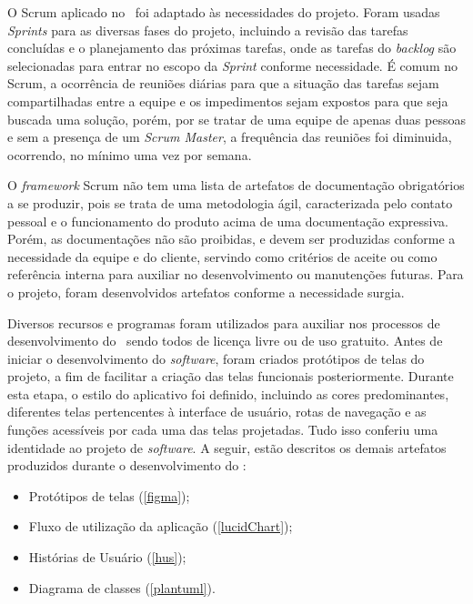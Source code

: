 O Scrum aplicado no \appName\ foi adaptado às necessidades do projeto. Foram usadas \textit{Sprints} para as diversas fases do projeto, incluindo a revisão das tarefas concluídas e o planejamento das próximas tarefas, onde as tarefas do \textit{backlog} são selecionadas para entrar no escopo da \textit{Sprint} conforme necessidade. É comum no Scrum, a ocorrência de reuniões diárias para que a situação das tarefas sejam compartilhadas entre a equipe e os impedimentos sejam expostos para que seja buscada uma solução, porém, por se tratar de uma equipe de apenas duas pessoas e sem a presença de um \textit{Scrum Master}, a frequência das reuniões foi diminuida, ocorrendo, no mínimo uma vez por semana.

O \textit{framework} Scrum não tem uma lista de artefatos de documentação obrigatórios a se produzir, pois se trata de uma metodologia ágil, caracterizada pelo contato pessoal e o funcionamento do produto acima de uma documentação expressiva. Porém, as documentações não são proibidas, e devem ser produzidas conforme a necessidade da equipe e do cliente, servindo como critérios de aceite ou como referência interna para auxiliar no desenvolvimento ou manutenções futuras. Para o projeto, foram desenvolvidos artefatos conforme a necessidade surgia.

Diversos recursos e programas foram utilizados para auxiliar nos processos de desenvolvimento do \appName\, sendo todos de licença livre ou de uso gratuito. Antes de iniciar o desenvolvimento do \textit{software}, foram criados protótipos de telas do projeto, a fim de facilitar a criação das telas funcionais posteriormente. Durante esta etapa, o estilo do aplicativo foi definido, incluindo as cores predominantes, diferentes telas pertencentes à interface de usuário, rotas de navegação e as funções acessíveis por cada uma das telas projetadas. Tudo isso conferiu uma identidade ao projeto de \textit{software}. A seguir, estão descritos os demais artefatos produzidos durante o desenvolvimento do \appName:

\begin{itemize}
    \item Protótipos de telas (\ref{figma});
    \item Fluxo de utilização da aplicação (\ref{lucidChart});
    \item Histórias de Usuário (\ref{hus});
    \item Diagrama de classes (\ref{plantuml}).
\end{itemize}

